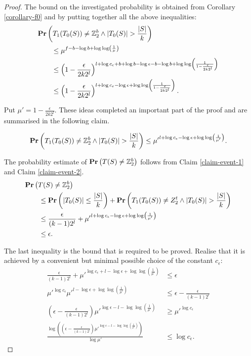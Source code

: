 \begin{proof}
The bound on the investigated probability is obtained from Corollary \ref{corollary-f0} and by putting together all the above inequalities:
\[
\begin{split}
& \mathbf{Pr}\left(T_1(T_0(S)) \neq \mathbb{Z}_{2}^{b} \wedge |T_0(S)| > \frac{|S|}{k}\right) \\
	& \qquad \leq \mu ^ {f - b - \log b + \log \log \left(\frac{1}{\mu}\right)} \\
	& \qquad \leq \left(1 - \frac{\epsilon}{2 k 2 ^ l}\right)^{l + \log c_\epsilon + b + \log b - \log \epsilon - b - \log b + \log \log \left(\frac{1}{1 - \frac{\epsilon}{2 k 2 ^ l}}\right)} \\
	& \qquad \leq \left(1 - \frac{\epsilon}{2 k 2 ^ l}\right)^{l + \log c_\epsilon - \log \epsilon + \log \log \left(\frac{1}{1 - \frac{\epsilon}{2 k 2 ^ l}}\right)} \text{.}
\end{split}
\]

Put $\mu' = 1 - \frac{\epsilon}{2k2 ^ l}$. These ideas completed an important part of the proof and are summarised in the following claim.
\begin{claim}
\label{claim-event-2}
\[
	\mathbf{Pr}\left(T_1(T_0(S)) \neq \mathbb{Z}_{2}^{b} \wedge |T_0(S)| > \frac{|S|}{k}\right) \leq {\mu'} ^ {l + \log c_\epsilon - \log \epsilon + \log \log \left(\frac{1}{\mu'}\right)} \text{.}
\]
\end{claim}

The probability estimate of $\mathbf{Pr}\left(T(S) \neq \mathbb{Z}_{2}^{b}\right)$ follows from Claim \ref{claim-event-1} and Claim \ref{claim-event-2}.
\[
\begin{split}
& \mathbf{Pr}\left(T(S) \neq \mathbb{Z}_{2}^{b}\right) \\
	& \qquad \leq \mathbf{Pr}\left(|T_0(S)| \leq \frac{|S|}{k}\right) + \mathbf{Pr}\left(T_1(T_0(S)) \neq Z_2^t \wedge |T_0(S)| > \frac{|S|}{k}\right) \\ 
	& \qquad \leq \frac{\epsilon}{(k - 1) 2 ^ l} + {\mu'} ^ {l + \log c_\epsilon - \log \epsilon + \log \log \left(\frac{1}{\mu'}\right)} \\
	& \qquad \leq \epsilon \text{.}
\end{split}
\]

The last inequality is the bound that is required to be proved. Realise that it is achieved by a convenient but minimal possible choice of the constant $c_\epsilon$:
\[
\begin{split}
\frac{\epsilon}{(k - 1) 2 ^ l} + {\mu'}^{\log c_\epsilon + l - \log \epsilon + \log \log \left(\frac{1}{\mu'}\right)} & \leq \epsilon \\
{\mu'}^{\log c_\epsilon}{\mu'}^{l - \log \epsilon + \log \log \left(\frac{1}{\mu'}\right)} & \leq \epsilon - \frac{\epsilon}{(k - 1) 2 ^ l} \\
\left(\epsilon - \frac{\epsilon}{(k - 1) 2 ^ l}\right) {\mu'}^{\log \epsilon - l - \log \log \left(\frac{1}{\mu'}\right)} & \geq {\mu'}^{\log c_\epsilon} \\
\frac{\log \left( \left( \epsilon - \frac{\epsilon}{(k - 1) 2 ^ l}\right) {\mu'}^{\log \epsilon - l - \log \log \left(\frac{1}{\mu'}\right)}\right)}{\log \mu'} & \leq {\log c_\epsilon} \text{.}
\end{split}
\]


\end{proof}

